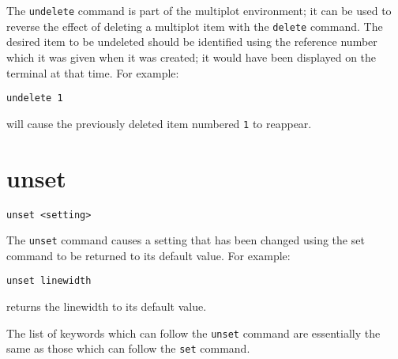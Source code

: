 The {\tt undelete} command is part of the multiplot environment; it can be used
to reverse the effect of deleting a multiplot item with the {\tt delete}
command. The desired item to be undeleted should be identified using the
reference number which it was given when it was created; it would have been
displayed on the terminal at that time. For example:

\begin{verbatim}
undelete 1
\end{verbatim}

\noindent will cause the previously deleted item numbered {\tt 1} to reappear.
  
\section{unset}

\begin{verbatim}
unset <setting>
\end{verbatim}

The {\tt unset} command causes a setting that has been changed using the set
command to be returned to its default value.  For example:

\begin{verbatim}
unset linewidth
\end{verbatim}

\noindent returns the linewidth to its default value.

The list of keywords which can follow the {\tt unset} command are essentially
the same as those which can follow the {\tt set} command.
